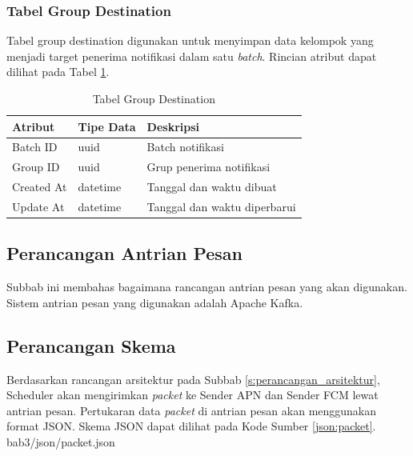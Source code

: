 \subsubsection{Tabel Group Destination}
\par Tabel group destination digunakan untuk menyimpan data kelompok yang menjadi target penerima notifikasi dalam satu \textit{batch}. Rincian atribut dapat dilihat pada Tabel \ref{tabel_group_destination}.
\begin{longtable}{|p{2cm}|p{2.5cm}|p{4.5cm}|}
	\caption{Tabel Group Destination} \label{tabel_group_destination} \\ \hline
    \textbf{Atribut} & \textbf{Tipe Data} & \textbf{Deskripsi} \\ \hline
    Batch ID & uuid & Batch notifikasi \\ \hline
    Group ID & uuid & Grup penerima notifikasi \\ \hline
    Created At & datetime & Tanggal dan waktu dibuat \\ \hline
    Update At & datetime & Tanggal dan waktu diperbarui \\ \hline
\end{longtable}

\subsection{Perancangan Antrian Pesan}
\par Subbab ini membahas bagaimana rancangan antrian pesan yang akan digunakan. Sistem antrian pesan yang digunakan adalah Apache Kafka.

\subsection{Perancangan Skema}
\par Berdasarkan rancangan arsitektur pada Subbab \ref{s:perancangan_arsitektur}, Scheduler akan mengirimkan \textit{packet} ke Sender APN dan Sender FCM lewat antrian pesan. Pertukaran data \textit{packet} di antrian pesan akan menggunakan format JSON. Skema JSON dapat dilihat pada Kode Sumber \ref{json:packet}.
 {bab3/json/packet.json}

